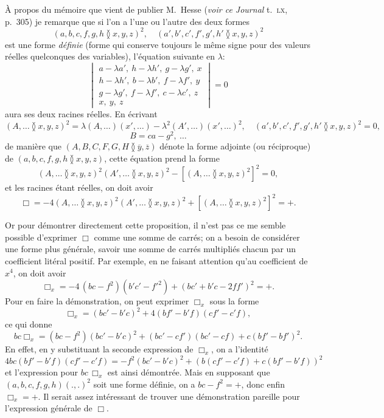 \documentclass[11pt,a4paper]{article}
\begin{document}
\noindent \`A propos du m\'{e}moire que vient de publier M.\ Hesse (\textit{voir ce Journal} t.\ \textsc{lx}, p.\ 305) je remarque que si l'on a l'une ou l'autre des deux formes
\[
(a, b, c, f, g, h\!\between\! x, y, z)^2,\quad (a', b', c', f', g', h'\!\between\! x, y, z)^2
\]
est une forme \textit{d\'{e}finie} (forme qui conserve toujours le m\^{e}me signe pour des valeurs r\'{e}elles quelconques des variables), l'\'{e}quation suivante en $\lambda$:
\[
\begin{vmatrix}
a-\lambda a',\ h-\lambda h',\ g-\lambda g',\ x \\
h-\lambda h',\ b-\lambda b',\ f-\lambda f',\ y \\
g-\lambda g',\ f-\lambda f',\ c-\lambda c',\ z \\
x,\ y,\ z
\end{vmatrix} = 0
\]
aura ses deux racines r\'{e}elles. En \'{e}crivant
\[
(A, \ldots\!\between\! x, y, z)^2 = \lambda(A, \ldots)(x',\ldots) - \lambda^2(A',\ldots)(x',\ldots)^2,\quad (a', b', c', f', g', h'\!\between\! x, y, z)^2 = 0,
\]
\[
B=ca-g^2,\ \ldots
\]
de mani\`{e}re que $(A, B, C, F, G, H\!\between\! \overline{y}, \overline{z})$ d\'{e}note la forme adjointe (ou r\'{e}ciproque) de $(a, b, c, f, g, h\!\between\! x, y, z)$, cette \'{e}quation prend la forme
\[
(A, \ldots\!\between\! x, y, z)^2(A', \ldots\!\between\! x, y, z)^2 - [(A, \ldots\!\between\! x, y, z)^2]^2 = 0,
\]
et les racines \'{e}tant r\'{e}elles, on doit avoir
\[
\Box = -4 (A, \ldots\!\between\! x, y, z)^2(A', \ldots\!\between\! x, y, z)^2 + [(A, \ldots\!\between\! x, y, z)^2]^2 = +.
\]

\medskip

\noindent Or pour d\'{e}montrer directement cette proposition, il n'est pas ce me semble possible d'exprimer $\Box$ comme une somme de carr\'{e}s; on a besoin de consid\'{e}rer une forme plus g\'{e}n\'{e}rale, savoir une somme de carr\'{e}s multipli\'{e}s chacun par un coefficient lit\'{e}ral positif. Par exemple, en ne faisant attention qu'au coefficient de $x^4$, on doit avoir
\[
\Box_x = -4\,(bc - f^2)(b'c' - f'^2) + (bc' + b'c - 2ff')^2 = +.
\]
Pour en faire la d\'{e}monstration, on peut exprimer $\Box_x$ sous la forme
\[
\Box_x = (bc' - b'c)^2 + 4(b f' - b' f)(c f' - c' f),
\]
ce qui donne
\[
b c \Box_x = (bc - f^2)(bc' - b'c)^2 + (b c' - c f')(bc' - c f) + c(bf' - bf')^2.
\]
En effet, en y substituant la seconde expression de $\Box_x$, on a l'identit\'{e}
\[
4bc(bf' - b'f)(c f' - c' f) = -f^2(bc' - b'c)^2 + (b(cf' - c'f) + c(bf' - b'f))^2
\]
et l'expression pour $bc\,\Box_x$ est ainsi d\'{e}montr\'{e}e. Mais en supposant que $(a, b, c, f, g, h)(.,.)^2$ soit une forme d\'{e}finie, on a $bc - f^2 = +$, donc enfin $\Box_x = +$. Il serait assez int\'{e}ressant de trouver une d\'{e}monstration pareille pour l'expression g\'{e}n\'{e}rale de $\Box$.
\end{document}
